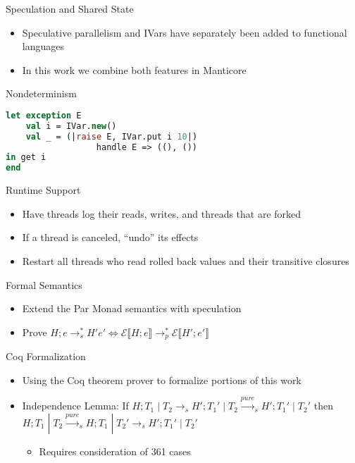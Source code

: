 \documentclass[mathserif]{beamer}
\newcommand{\bis}[1]{\begin{itemize}\setlength{\itemsep}{#1}}
\begin{document}
\begin{frame}{Speculation and Shared State}
\begin{itemize}
\item  Speculative parallelism and IVars have separately been added to functional languages
\item In this work we combine both features in Manticore
\end{itemize}
\end{frame}

\begin{frame}[fragile]{Nondeterminism}

\begin{lstlisting}[language=ML, mathescape, keywordstyle=\color{blue}, morekeywords={pval, pcase},basicstyle=\footnotesize, xleftmargin=7.0ex]
let exception E
    val i = IVar.new()
    val _ = (|raise E, IVar.put i 10|) 
    	          handle E => ((), ())
in get i
end
\end{lstlisting}

\end{frame}

\begin{frame}{Runtime Support}
\bis{.5cm}
\item Have threads log their reads, writes, and threads that are forked
\item If a thread is canceled, ``undo'' its effects
\item Restart all threads who read rolled back values and their transitive closures
\end{itemize}
\end{frame}

\begin{frame}{Formal Semantics}
\bis{.5cm}
\item Extend the Par Monad semantics with speculation

\item Prove $H; e \rightarrow^*_s H' e' \iff \mathcal{E}\llbracket H; e\rrbracket \rightarrow^*_p \mathcal{E}\llbracket H'; e' \rrbracket$

\end{itemize}
\end{frame}

\begin{frame}{Coq Formalization}
\bis{.5cm}
\item Using the Coq theorem prover to formalize portions of this work

\item Independence Lemma: If $H; T_1\;|\;T_2 \rightarrow_s H'; T_1' \; | \; T_2 \xrightarrow{pure}_s H'; T_1'\;|\;T_2'$ then $H; T_1\;|\;T_2 \xrightarrow{pure}_s H; T_1 \; | \; T_2' \rightarrow_s H'; T_1'\;|\;T_2'$

\begin{itemize}
\item Requires consideration of 361 cases
\end{itemize}

\end{itemize}
\end{frame}
\end{document}
